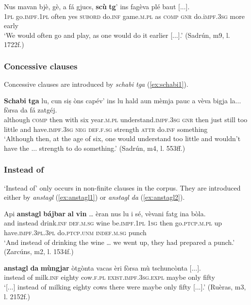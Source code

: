 \ea
\label{ex:comparative3}
\gll Nus mavan bjè, gè, a fá gjucs, \textbf{scù} \textbf{tg}’ ins fagèva plé baut [...].   \\
\textsc{1pl} go.\textsc{impf.1pl} often yes \textsc{subord} do.\textsc{inf} game.\textsc{m.pl} as \textsc{comp} \textsc{gnr} do.i\textsc{mpf.3sg} more early \\
\glt `We would often go and play, as one would do it earlier [...].' (Sadrún, m9, l. 1722f.)
\z

\subsubsection{Concessive clauses}
Concessive clauses are introduced by \textit{schabi tga} (\ref{ex:schabi1}).

\ea
\label{ex:schabi1}
\gll \textbf{Schabi} \textbf{tga} lu, cun siṣ òns capév’ ins lu hald aun mèmja pauc a vèva bigja la... fòrsa da fá zatgéj.   \\
although \textsc{comp} then with six year.\textsc{m.pl} understand.\textsc{impf.3sg} \textsc{gnr} then just still too little and have.\textsc{impf.3sg} \textsc{neg} \textsc{def.f.sg} strength \textsc{attr} do.\textsc{inf} something\\
\glt `Although then, at the age of six, one would understand too little and wouldn’t have the ... strength to do something.' (Sadrún, m4, l. 553ff.)
\z

\subsubsection{Instead of}
`Instead of' only occurs in non-finite clauses in the corpus. They are introduced either by \textit{anstagl} (\ref{ex:anstagl1}) or \textit{anstagl da} (\ref{ex:anstagl2}).

\ea
\label{ex:anstagl1}
\gll    Api \textbf{anstagl} \textbf{bájbar} \textbf{al} \textbf{vin} … èran nus lu i sé, vèvani fatg ina bòla.\\
and instead drink.\textsc{inf} \textsc{def.m.sg} wine {} be.\textsc{impf.1pl} \textsc{1sg} then go.\textsc{ptcp.m.pl} up have.\textsc{impf.3pl.3pl} do.\textsc{ptcp.unm} \textsc{indef.m.sg} punch \\
\glt `And instead of drinking the wine … we went up, they had prepared a punch.' (Zarcúns, m2, l. 1534f.)
\z

\ea
\label{ex:anstagl2}
	\gll [...] \textbf{anstagl} \textbf{da} \textbf{mùngjar} òtgònta vacas èri fòrsa mù tschuncònta [...].\\
 {} instead of milk.\textsc{inf} eighty cow.\textsc{f.pl} \textsc{exist.impf.3sg.expl} maybe only fifty\\
\glt `[...]  instead of milking eighty cows there were maybe only fifty [...].' (Ruèras, m3, l. 2152f.)
\z



